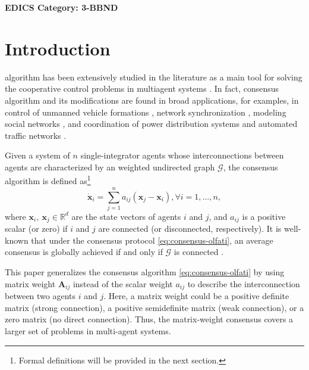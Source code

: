 \documentclass[draftclsnofoot,11pt,onecolumn]{IEEEtran}
\newcommand{\m}[1]{\mathbf{#1}}
\newcommand{\mc}[1]{\mathcal{#1}}
\newcommand{\mb}[1]{\mathbb{#1}}
\begin{document}
\ifCLASSOPTIONpeerreview
\begin{center} \bfseries EDICS Category: 3-BBND \end{center}
\fi

\IEEEpeerreviewmaketitle



\section{Introduction}
\label{sec:1}
 algorithm has been extensively studied in the literature as a main tool for solving the cooperative control problems in multiagent systems \cite{Olfati2004,Olfati2007,ren2005survey}. In fact, consensus algorithm and its modifications are found in broad applications, for examples, in control of unmanned vehicle formations \cite{Fax2004,Lafferriere2005,Ren2007scl,Oh2015survey}, network synchronization \cite{Kim2013aut,Tuna2009tac}, modeling social networks \cite{Hendrickx2014,Xia2016}, and coordination of power distribution systems and automated traffic networks \cite{Kim2016aut,Kim2016sj}.

Given a system of $n$ single-integrator agents whose interconnections between agents are characterized by an weighted undirected graph $\mc{G}$, the consensus algorithm \cite{Olfati2004} is defined as\footnote{Formal definitions will be provided in the next section.}
\begin{equation} \label{eq:consensus-olfati}
\dot{\m{x}}_i = \sum_{j =1}^n a_{ij}(\m{x}_j - \m{x}_i), \forall i =1, \ldots, n,
\end{equation}
where $\m{x}_i,~\m{x}_j \in \mb{R}^d$ are the state vectors of agents $i$ and $j$, and $a_{ij}$ is a positive scalar (or zero) if $i$ and $j$ are connected (or disconnected, respectively). It is well-known that under the consensus protocol \eqref{eq:consensus-olfati}, an average consensus is globally achieved if and only if $\mc{G}$ is connected \cite{Olfati2004}.

This paper generalizes the consensus algorithm \eqref{eq:consensus-olfati} by using matrix weight $\m{A}_{ij}$ instead of the scalar weight $a_{ij}$ to describe the interconnection between two agents $i$ and $j$. Here, a matrix weight could be a positive definite matrix (strong connection), a positive semidefinite matrix (weak connection), or a zero matrix (no direct connection). Thus, the matrix-weight consensus covers a larger set of problems in multi-agent systems. 
\end{document}
